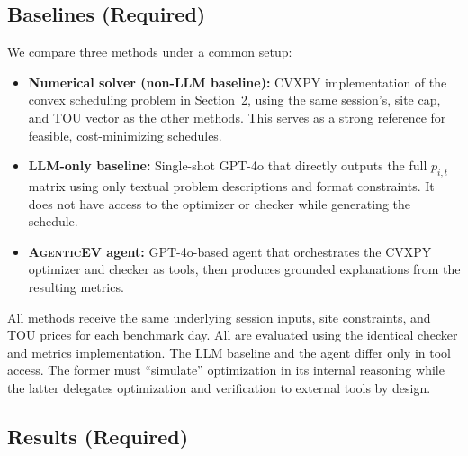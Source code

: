 \documentclass{article}
\newcommand{\modelname}{\textsc{AgenticEV}}
\begin{document}
\subsection{Baselines (Required)}
We compare three methods under a common setup:
\begin{itemize}
  \item \textbf{Numerical solver (non-LLM baseline):} CVXPY implementation of the convex scheduling problem in Section~2, using the same session's, site cap, and TOU vector as the other methods. This serves as a strong reference for feasible, cost-minimizing schedules.
  \item \textbf{LLM-only baseline:} Single-shot GPT-4o that directly outputs the full $p_{i,t}$ matrix using only textual problem descriptions and format constraints. It does not have access to the optimizer or checker while generating the schedule.
  \item \textbf{\modelname{} agent:} GPT-4o-based agent that orchestrates the CVXPY optimizer and checker as tools, then produces grounded explanations from the resulting metrics.
\end{itemize}
All methods receive the same underlying session inputs, site constraints, and TOU prices for each benchmark day. All are evaluated using the identical checker and metrics implementation. The LLM baseline and the agent differ only in tool access. The former must ``simulate'' optimization in its internal reasoning while the latter delegates optimization and verification to external tools by design.

\subsection{Results (Required)}
\end{document}

